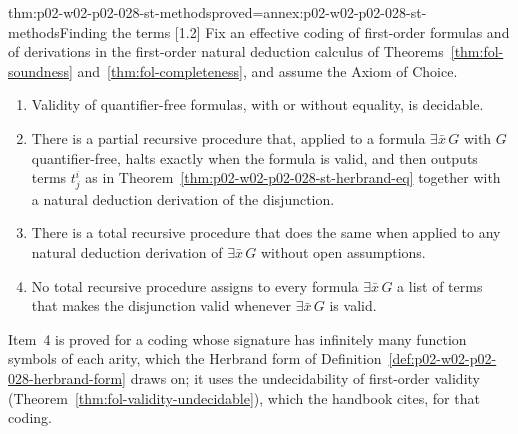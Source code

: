 \begin{hbcorollary}{thm:p02-w02-p02-028-st-methods}{proved=annex:p02-w02-p02-028-st-methods}{Finding the terms [1.2]}
Fix an effective coding of first-order formulas and of derivations in the
first-order natural deduction calculus of Theorems~\ref{thm:fol-soundness}
and~\ref{thm:fol-completeness}, and assume the Axiom of Choice.
\begin{enumerate}
  \item Validity of quantifier-free formulas, with or without equality, is
        decidable.
  \item There is a partial recursive procedure that, applied to a formula
        \(\exists\bar x\,G\) with \(G\) quantifier-free, halts exactly when
        the formula is valid, and then outputs terms \(t^i_j\) as in
        Theorem~\ref{thm:p02-w02-p02-028-st-herbrand-eq} together with a
        natural deduction derivation of the disjunction.
  \item There is a total recursive procedure that does the same when applied
        to any natural deduction derivation of \(\exists\bar x\,G\) without
        open assumptions.
  \item No total recursive procedure assigns to every formula
        \(\exists\bar x\,G\) a list of terms that makes the disjunction valid
        whenever \(\exists\bar x\,G\) is valid.
\end{enumerate}
Item~4 is proved for a coding whose signature has infinitely many function
symbols of each arity, which the Herbrand form of
Definition~\ref{def:p02-w02-p02-028-herbrand-form} draws on; it uses the
undecidability of first-order validity
(Theorem~\ref{thm:fol-validity-undecidable}), which the handbook cites, for
that coding.
\end{hbcorollary}

